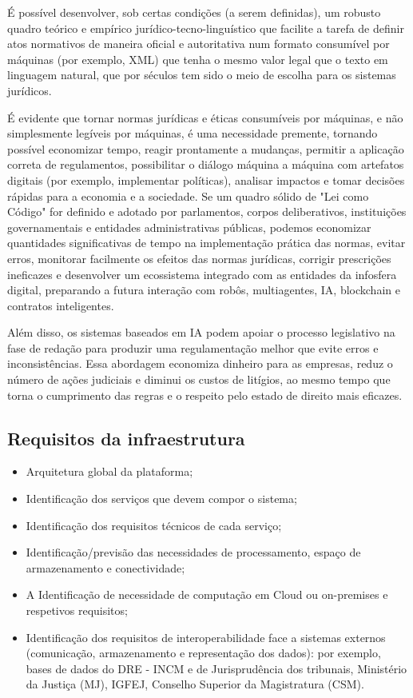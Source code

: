 \begin{quoting}
    É possível desenvolver, sob certas condições (a serem definidas), um robusto quadro teórico e empírico 
    jurídico-tecno-linguístico que facilite a tarefa de definir atos normativos de maneira oficial e autoritativa num 
    formato consumível por máquinas (por exemplo, XML) que tenha o mesmo valor legal que o texto em linguagem natural, 
    que por séculos tem sido o meio de escolha para os sistemas jurídicos.

    É evidente que tornar normas jurídicas e éticas consumíveis por máquinas, e não simplesmente legíveis por máquinas, 
    é uma necessidade premente, tornando possível economizar tempo, reagir prontamente a mudanças, permitir a aplicação 
    correta de regulamentos, possibilitar o diálogo máquina a máquina com artefatos digitais (por exemplo, implementar 
    políticas), analisar impactos e tomar decisões rápidas para a economia e a sociedade. 
    Se um quadro sólido de "Lei como Código" for definido e adotado por parlamentos, corpos deliberativos, 
    instituições governamentais e entidades administrativas públicas, podemos economizar quantidades significativas de 
    tempo na implementação prática das normas, evitar erros, monitorar facilmente os efeitos das normas jurídicas, 
    corrigir prescrições ineficazes e desenvolver um ecossistema integrado com as entidades da infosfera digital, 
    preparando a futura interação com robôs, multiagentes, IA, blockchain e contratos inteligentes.
    
    Além disso, os sistemas baseados em IA podem apoiar o processo legislativo na fase de redação para produzir uma 
    regulamentação melhor que evite erros e inconsistências. Essa abordagem economiza dinheiro para as empresas, reduz o 
    número de ações judiciais e diminui os custos de litígios, ao mesmo tempo que torna o cumprimento das regras e o 
    respeito pelo estado de direito mais eficazes.
\end{quoting}    


\subsection{Requisitos da infraestrutura}

\begin{itemize}
\item Arquitetura global da plataforma;
\item Identificação dos serviços que devem compor o sistema;
\item Identificação dos requisitos técnicos de cada serviço;
\item Identificação/previsão das necessidades de processamento, espaço de armazenamento e
conectividade;
\item A Identificação de necessidade de computação em Cloud ou on-premises e respetivos
requisitos;
\item Identificação dos requisitos de interoperabilidade face a sistemas externos (comunicação,
armazenamento e representação dos dados): por exemplo, bases de dados do DRE - INCM e
de Jurisprudência dos tribunais, Ministério da Justiça (MJ), IGFEJ, 
Conselho Superior da Magistratura (CSM).
\end{itemize}


